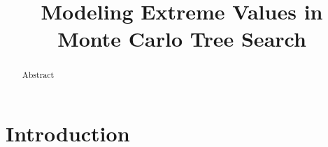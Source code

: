 \documentclass[runningheads,a4paper]{llncs}
\begin{document}
\mainmatter  %

\title{Modeling Extreme Values in Monte Carlo Tree Search}

\titlerunning{ }

%
%
\author{ }
%
\authorrunning{ }

% 

\institute{ }


%
%


\maketitle


\begin{abstract}
Abstract
\end{abstract}

\section{Introduction}
\end{document}
